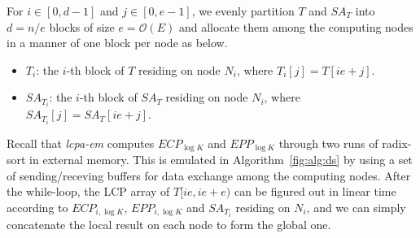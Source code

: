 \documentclass{llncs}
\begin{document}
For $i\in [0,d-1]$ and $j\in [0,e-1]$, we evenly partition $T$ and $SA_T$ into $d=n/e$ blocks of size $e=\mathcal{O}(E)$ and allocate them among the computing nodes in a manner of one block per node as below.

\begin{itemize}
\item $T_i$: the $i$-th block of $T$ residing on node $N_i$, where $T_i[j] = T[ie+j]$.
\item $SA_{T_i}$: the $i$-th block of $SA_T$ residing on node $N_i$, where $SA_{T_i}[j] = SA_T[ie+j]$.
\end{itemize}

Recall that {\em lcpa-em} computes $ECP_{\log K}$ and $EPP_{\log K}$ through two runs of radix-sort in external memory. This is emulated in Algorithm~\ref{fig:alg:ds} by using a set of sending/receving buffers for data exchange among the computing nodes. After the while-loop, the {LCP} array of $T[ie,ie+e)$ can be figured out in linear time according to $ECP_{i,{\log K}}$, $EPP_{i,{\log K}}$ and $SA_{T_i}$ residing on $N_i$, and we can simply concatenate the local result on each node to form the global one.
\end{document}

